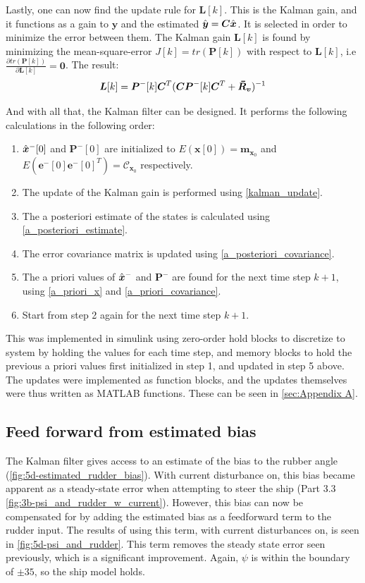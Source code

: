 Lastly, one can now find the update rule for $\bm{L}[k]$. This is the Kalman gain, and it functions as a gain to $\bm{y}$ and the estimated $\hat{\bm{y}} = \bm{C}\hat{\bm{x}}$. It is selected in order to minimize the error between them. The Kalman gain $\bm{L}[k]$ is found by minimizing the mean-square-error $J[k] = tr(\bm{P}[k])$ with respect to $\bm{L}[k]$, i.e $\frac{\partial tr(\bm{P}[k])}{\partial\bm{L}[k]} = \bm{0}$. The result:
\begin{equation}
\bm{L}[k] = \bm{P}^-[k]\bm{C}^T(\bm{CP}^-[k]\bm{C}^T+\bmbar{R}_{\bm{v}})^{-1} \label{kalman_update}
\end{equation}

And with all that, the Kalman filter can be designed. It performs the following calculations in the following order:
\begin{enumerate}
 \item $\hat{\bm{x}}^-[0]$ and $\bm{P}^-[0]$ are initialized to $E(\bm{x}[0]) = \bm{m}_{\bm{x}_0}$ and $E(\bm{e}^-[0]\bm{e}^-[0]^T) = \mathcal{C}_{\bm{x}_0}$ respectively.
 \item The update of the Kalman gain is performed using  \cref{kalman_update}.
 \item The a posteriori estimate of the states is calculated using  \cref{a_posteriori_estimate}.
 \item The error covariance matrix is updated using  \cref{a_posteriori_covariance}.
 \item The a priori values of $\hat{\bm{x}}^-$ and $\bm{P}^-$ are found for the next time step $k+1$, using \cref{a_priori_x} and \cref{a_priori_covariance}.
 \item Start from step 2 again for the next time step $k+1$.
\end{enumerate}

This was implemented in simulink using zero-order hold blocks to discretize to system by holding the values for each time step, and memory blocks to hold the previous a priori values first initialized in step 1, and updated in step 5 above. The updates were implemented as function blocks, and the updates themselves were thus written as MATLAB functions. These can be seen in \cref{sec:Appendix A}.

\subsection{Feed forward from estimated bias}
The Kalman filter gives access to an estimate of the bias to the rubber angle (\cref{fig:5d-estimated_rudder_bias}).  With current disturbance on, this bias became apparent as a steady-state error when attempting to steer the ship (Part 3.3 \cref{fig:3b-psi_and_rudder_w_current}).  However, this bias can now be compensated for by adding the estimated bias as a feedforward term to the rudder input.  The results of using this term, with current disturbances on, is seen in \cref{fig:5d-psi_and_rudder}.  This term removes the steady state error seen previously, which is a significant improvement. Again, $\psi$ is within the boundary of $\pm35$, so the ship model holds.

